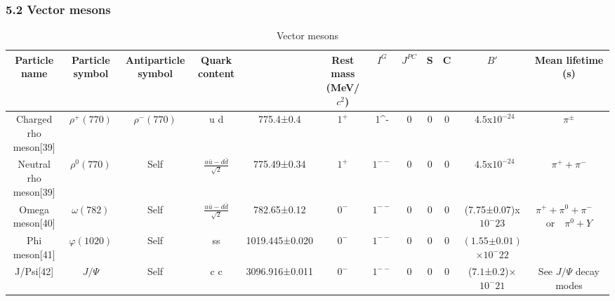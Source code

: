 \subsubsection{5.2 Vector mesons}
\begin{table}[ht]
\centering
\caption{Vector mesons}\label{tab_JZ6}
\begin{tabular}{|c|c|c|c|c|c|c|c|c|c|c|c|}
\hline
Particle name & Particle
symbol & Antiparticle
symbol & Quark
content & & Rest mass (MeV/$c^2$)	 & $I^G$ & $J^{PC}$&S & C & $B'$ & Mean lifetime (s) \\
\hline
Charged rho meson[39] & $\rho^+(770)$ & $\rho^-(770)$ & u d &  775.4±0.4   & $1^+$ & 1^- & 0 &0 & 0 & ~$4.5$x$10^{-24}$ & $\pi^\pm$ \\
\hline
Neutral rho meson[39] & $\rho^0(770)$ & Self & $\frac{u\bar u-d\bar d}{\sqrt{2}}$ & 775.49±0.34  & $1^+$ & $1^{--}$ & 0 & 0 & 0 & ~$4.5$x$10^{-24}$ & $\pi^+ +\pi^-$ \\
\hline
Omega meson[40] &  $\omega(782)$&Self &  $\frac{u\bar u-d\bar d}{\sqrt{2}}$& 782.65±0.12  & $0^-$ & $1^{--}$ & 0 & 0 &0 &(7.75±0.07)x$10^-{23}$& $\pi^+ +\pi^0 +\pi^-  \quad$ or$\quad \pi^0+Y$\\
\hline
Phi meson[41] & $\varphi(1020)$ & Self & ss &  1019.445±0.020&  $0^-$ & $1^{--}$  & 0 & 0 & 0& $(1.55\text{±}0.01)$×$10^-22$ &  \\
\hline
J/Psi[42] & $J/\Psi$ & Self & c c &  3096.916±0.011 & $0^-$ & $1^{--}$  & 0 & 0 & 0 & ($7.1$±$0.2$)×$10^-21$ & See $J/\Psi$  decay modes\\
\hline



\end{tabular}
\end{table}

